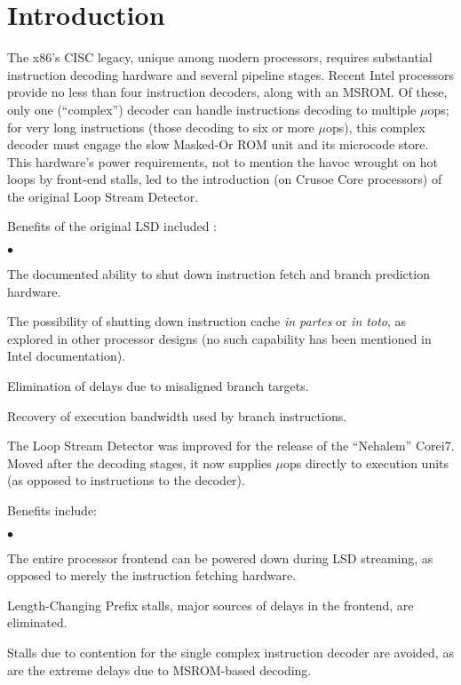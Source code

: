 \documentclass[]{sigplanconf}
\newcommand{\squishlist}{\begin{list}{$\bullet$}
  {\setlength{\itemsep}{0pt}
    \setlength{\parsep}{3pt}
    \setlength{\topsep}{3pt}
    \setlength{\partopsep}{0pt}
    \setlength{\leftmargin}{1.5em}
    \setlength{\labelwidth}{1em}
    \setlength{\labelsep}{0.5em}}}
\newcommand{\squishend}{\end{list}}
\begin{document}
\section{Introduction}
The x86's CISC legacy, unique among modern processors, requires substantial
instruction decoding hardware and several pipeline stages. Recent Intel processors
provide no less than four instruction decoders, along with an MSROM. Of these,
only one (``complex'') decoder can handle instructions decoding to multiple
$\mu$ops; for very long instructions (those decoding to six or more $\mu$ops),
this complex decoder must engage the slow Masked-Or ROM unit and its
microcode store. This hardware's power requirements, not to mention the havoc
wrought on hot loops by front-end stalls, led to the introduction (on Crusoe
Core processors) of the original Loop Stream Detector.


Benefits of the original LSD included \cite{inteloptimize}:
\squishlist
\item The documented ability to shut down instruction fetch and branch prediction hardware.
\item The possibility of shutting down instruction cache \textit{in partes} or
\textit{in toto}, as explored in other processor designs \cite{badulescu} (no
such capability has been mentioned in Intel documentation).
\item Elimination of delays due to misaligned branch targets.
\item Recovery of execution bandwidth used by branch instructions.
\squishend

The Loop Stream Detector was improved for the release of the ``Nehalem''
Core\texttrademark i7. Moved after the decoding stages, it now supplies $\mu$ops directly
to execution units (as opposed to instructions to the decoder).


Benefits include:
\squishlist
\item The entire processor frontend can be powered down during LSD streaming,
as opposed to merely the instruction fetching hardware.
\item Length-Changing Prefix stalls, major sources of delays in the frontend,
are eliminated.
\item Stalls due to contention for the single complex instruction decoder are
avoided, as are the extreme delays due to MSROM-based decoding.
\squishend
\end{document}
